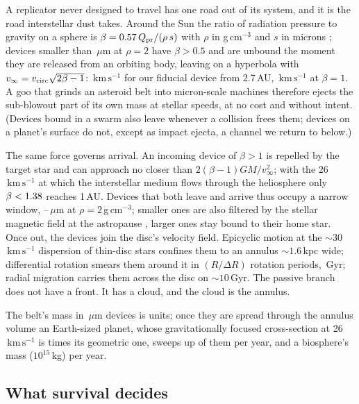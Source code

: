 \documentclass[11pt]{article}
\newcommand{\um}{\ensuremath{\,\mu\mathrm{m}}\xspace}
\newcommand{\kms}{\ensuremath{\,\mathrm{km\,s^{-1}}}\xspace}
\begin{document}
A replicator never designed to travel has one road out of its system, and it
is the road interstellar dust takes.  Around the Sun the ratio of radiation
pressure to gravity on a sphere is $\beta=0.57\,Q_{\rm pr}/(\rho\,s)$ with
$\rho$ in g\,cm$^{-3}$ and $s$ in microns \citep{Burns1979}; devices smaller
than \BlowoutRadiusUm\um at $\rho=2$ have $\beta>0.5$ and are unbound the
moment they are released from an orbiting body, leaving on a hyperbola with
$v_\infty=v_{\rm circ}\sqrt{2\beta-1}$: \VinfDevice\kms for our fiducial
device from 2.7\,AU, \VinfBetaOne\kms at $\beta=1$.  A goo that grinds an
asteroid belt into micron-scale machines therefore ejects the sub-blowout part
of its own mass at stellar speeds, at no cost and without intent.  (Devices
bound in a swarm also leave whenever a collision frees them; devices on a
planet's surface do not, except as impact ejecta, a channel we return to
below.)

The same force governs arrival.  An incoming device of $\beta>1$ is repelled
by the target star and can approach no closer than $2(\beta-1)GM/v_\infty^{2}$;
with the 26\kms at which the interstellar medium flows through the
heliosphere \citep{Grun1993,Landgraf2000} only $\beta<1.38$ reaches
1\,AU.  Devices that both leave and arrive thus occupy a narrow window,
\WindowLoUm--\WindowHiUm\um at $\rho=2$\,g\,cm$^{-3}$; smaller ones are also
filtered by the stellar magnetic field at the astropause \citep{Landgraf2000},
larger ones stay bound to their home star.  Once out, the devices join the
disc's velocity field.  Epicyclic motion at the $\sim30$\kms dispersion of
thin-disc stars confines them to an annulus $\sim1.6$\,kpc wide; differential
rotation smears them around it in $(R/\Delta R)$ rotation periods,
\AnnulusFillGyr\,Gyr; radial migration \citep{SellwoodBinney2002,Frankel2018}
carries them across the disc on $\sim10$\,Gyr.  The passive branch does not
have a front.  It has a cloud, and the cloud is the annulus.

The belt's mass in \SeedRadiusUm\um devices is \BeltDevicesReleased units; once
they are spread through the annulus volume an Earth-sized planet, whose
gravitationally focused cross-section at 26\kms is \FocusingFactor times its
geometric one, sweeps up \BeltArrivalsUnsurvived of them per year, and a
biosphere's mass ($10^{15}$\,kg) \BioArrivalsUnsurvived per year.

\subsection{What survival decides}
\label{sec:survival}
\end{document}
